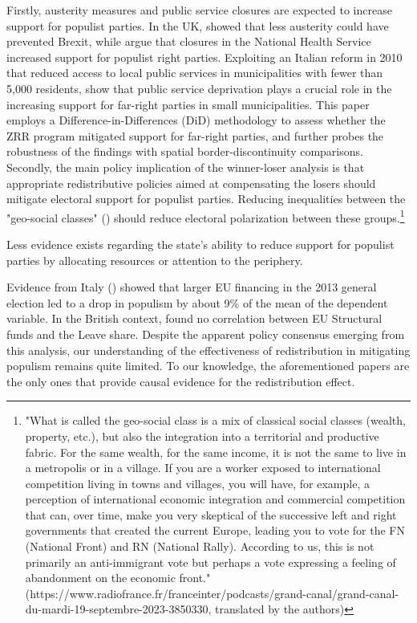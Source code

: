 Firstly, austerity measures and public service closures are expected to increase support for populist parties. In the UK, \cite{Fetzer2019} showed that less austerity could have prevented Brexit, while \cite{Vries} argue that closures in the National Health Service increased support for populist right parties. Exploiting an Italian reform in 2010 that reduced access to local public services in municipalities with fewer than 5,000 residents, \cite{Cremaschi} show that public service deprivation plays a crucial role in the increasing support for far-right parties in small municipalities. This paper employs a Difference-in-Differences (DiD) methodology to assess whether the ZRR program mitigated support for far-right parties, and further probes the robustness of the findings with spatial border-discontinuity comparisons. Secondly, the main policy implication of the winner-loser analysis is that appropriate redistributive policies aimed at compensating the losers should mitigate electoral support for populist parties. Reducing inequalities between the "geo-social classes" (\cite{Piketty}) should reduce electoral polarization between these groups.\footnote{"What is called the geo-social class is a mix of classical social classes (wealth, property, etc.), but also the integration into a territorial and productive fabric. For the same wealth, for the same income, it is not the same to live in a metropolis or in a village. If you are a worker exposed to international competition living in towns and villages, you will have, for example, a perception of international economic integration and commercial competition that can, over time, make you very skeptical of the successive left and right governments that created the current Europe, leading you to vote for the FN (National Front) and RN (National Rally). According to us, this is not primarily an anti-immigrant vote but perhaps a vote expressing a feeling of abandonment on the economic front." (https://www.radiofrance.fr/franceinter/podcasts/grand-canal/grand-canal-du-mardi-19-septembre-2023-3850330, translated by the authors)} 

Less evidence exists regarding the state's ability to reduce support for populist parties by allocating resources or attention to the periphery.

Evidence from Italy (\cite{ALBANESE2022}) showed that larger EU financing in the 2013 general election led to a drop in populism by about 9\% of the mean of the dependent variable. In the British context, \cite{Becker2017} found no correlation between EU Structural funds and the Leave share. Despite the apparent policy consensus emerging from this analysis, our understanding of the effectiveness of redistribution in mitigating populism remains quite limited. To our knowledge, the aforementioned papers are the only ones that provide causal evidence for the redistribution effect. 

